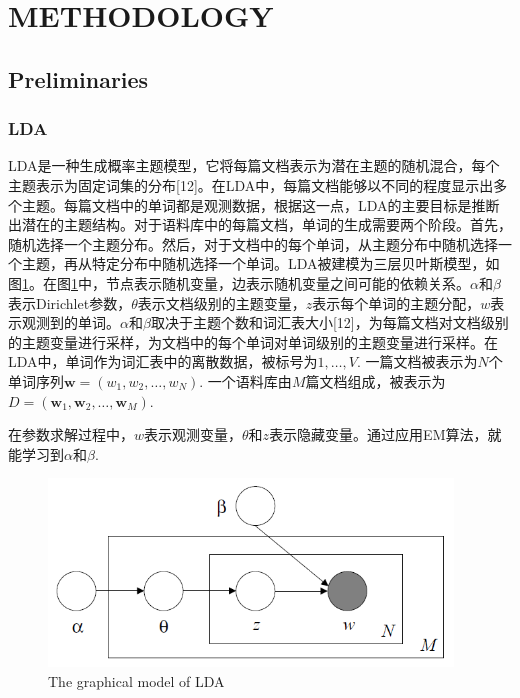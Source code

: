 \documentclass{article}
\begin{document}
\section{METHODOLOGY}
\subsection{Preliminaries}
\subsubsection{LDA}
LDA是一种生成概率主题模型，它将每篇文档表示为潜在主题的随机混合，每个主题表示为固定词集的分布[12]。在LDA中，每篇文档能够以不同的程度显示出多个主题。每篇文档中的单词都是观测数据，根据这一点，LDA的主要目标是推断出潜在的主题结构。对于语料库中的每篇文档，单词的生成需要两个阶段。首先，随机选择一个主题分布。然后，对于文档中的每个单词，从主题分布中随机选择一个主题，再从特定分布中随机选择一个单词。LDA被建模为三层贝叶斯模型，如图\ref{fig:lda_model}。在图\ref{fig:lda_model}中，节点表示随机变量，边表示随机变量之间可能的依赖关系。$\alpha$和$\beta$表示Dirichlet参数，$\theta$表示文档级别的主题变量，$z$表示每个单词的主题分配，$w$表示观测到的单词。$\alpha$和$\beta$取决于主题个数和词汇表大小[12]，为每篇文档对文档级别的主题变量进行采样，为文档中的每个单词对单词级别的主题变量进行采样。在LDA中，单词作为词汇表中的离散数据，被标号为$1,\dots,V$. 一篇文档被表示为$N$个单词序列$\textbf{w}=(w_1,w_2,\dots,w_N)$. 一个语料库由$M$篇文档组成，被表示为$D=(\textbf{w}_1,\textbf{w}_2,\dots,\textbf{w}_M)$.\par
在参数求解过程中，$w$表示观测变量，$\theta$和$z$表示隐藏变量。通过应用EM算法，就能学习到$\alpha$和$\beta$.

\begin{figure}[htbp]
	\centering\includegraphics[height=5cm]{lda_model.png}
	\caption{The graphical model of LDA}
	\label{fig:lda_model}
\end{figure}
\end{document}
